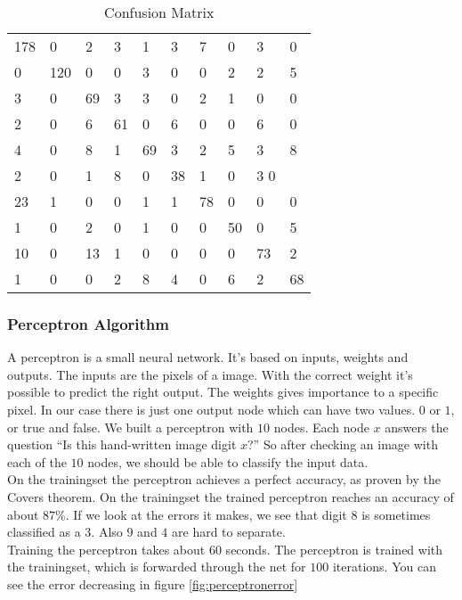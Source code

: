 \documentclass{article}
\begin{document}
\begin{table}[H]
	\begin{center}
		\begin{tabular}{llllllllll}
				178 & 0 & 2 & 3 & 1 & 3 & 7 & 0 & 3 & 0 \\
				0 & 120 & 0 & 0 & 3 & 0 & 0 & 2 & 2 & 5 \\
				3 & 0 & 69 & 3 & 3 & 0 & 2 & 1 & 0 & 0 \\
				2 & 0 & 6 & 61 & 0 & 6 & 0 & 0 & 6 & 0 \\
				4 & 0 & 8 & 1 & 69 & 3 & 2 & 5 & 3 & 8 \\
				2 & 0 & 1 & 8 & 0 & 38 & 1 & 0 & 3 0 \\
				23 & 1 & 0 & 0 & 1 & 1 & 78 & 0 & 0 & 0 \\
				1 & 0 & 2 & 0 & 1 & 0 & 0 & 50 & 0 & 5 \\
				10 & 0 & 13 & 1 & 0 & 0 & 0 & 0 & 73 & 2 \\
				1 & 0 & 0 & 2 & 8 & 4 & 0 & 6 & 2 & 68 \\
		\end{tabular}
	\end{center}
	\caption{Confusion Matrix}
	\label{tab:cm}
\end{table}

\subsubsection{Perceptron Algorithm}
A perceptron is a small neural network. It's based on inputs, weights and outputs. The inputs are the pixels of a image. With the correct weight it's possible to predict the right output. The weights gives importance to a specific pixel. In our case there is just one output node which can have two values. $0$ or $1$, or true and false. We built a perceptron with $10$ nodes. Each node $x$ answers the question ``Is this hand-written image digit $x$?'' So after checking an image with each of the $10$ nodes, we should be able to classify the input data.\\

On the trainingset the perceptron achieves a perfect accuracy, as proven by the Covers theorem. On the trainingset the trained perceptron reaches an accuracy of about $87$\%. If we look at the errors it makes, we see that digit $8$ is sometimes classified as a $3$. Also $9$ and $4$ are hard to separate.\\

Training the perceptron takes about $60$ seconds. The perceptron is trained with the trainingset, which is forwarded through the net for $100$ iterations. You can see the error decreasing in figure \ref{fig:perceptronerror}\\
\end{document}
